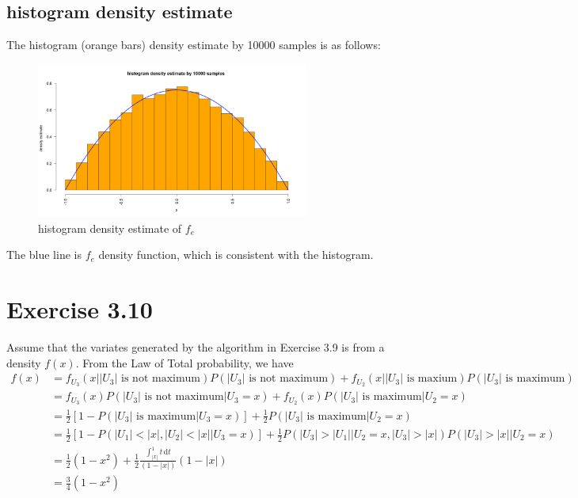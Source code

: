 \documentclass{article}
\begin{document}
    \subsection{histogram density estimate}
        The histogram (orange bars) density estimate by 10000 samples is as follows:
        \begin{figure}[H]
            \centering  %
            \includegraphics[width=0.8\textwidth]{3.9 estimate_of_fe.png}
            \caption{histogram density estimate of $f_e$}
        \end{figure}
        The blue line is $f_e$ density function, which is consistent with the histogram.

\section{Exercise 3.10}
    Assume that the variates generated by the algorithm in Exercise 3.9 is from
     a density $f(x)$. From the Law of Total probability, we have
     \begin{align*}
        f(x) &= f_{U_3}(x\bigg||U_3|\text{ is not maximum}) P(|U_3|\text{ is not maximum})
            + f_{U_2}(x\bigg||U_3| \text{ is maxium}) P(|U_3|\text{ is maximum}) \\
            & = f_{U_3}(x) P(|U_3|\text{ is not maximum}\bigg|U_3=x)
            + f_{U_2}(x) P(|U_3|\text{ is maximum}\bigg| U_2=x) \\
            & = \frac{1}{2} [1-P(|U_3|\text{ is maximum}\bigg|U_3=x)] 
            + \frac{1}{2} P(|U_3|\text{ is maximum}\bigg|U_2=x) \\
            & = \frac{1}{2} [1-P(|U_1|<|x|, |U_2|<|x| \bigg|U_3=x)] 
            + \frac{1}{2} P(|U_3|>|U_1|\bigg| U_2=x,|U_3|>|x|) P(|U_3|>|x|\bigg| U_2=x) \\
            &= \frac{1}{2}(1-x^2) + \frac{1}{2} \frac{\int_{|x|}^1t\,\text{d}t}{(1-|x|)}(1-|x|) \\
            &= \frac{3}{4}(1-x^2)
     \end{align*} 
     
\end{document}
